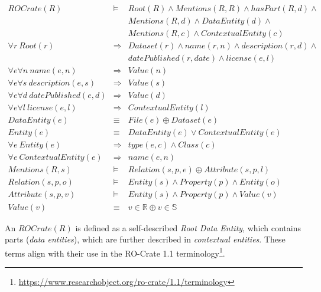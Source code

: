 \small
\begin{eqnarray*}
\label{minimalcrate}
ROCrate(R)                                  & \models & Root(R) \land Mentions(R, R) \land hasPart(R, d) \land \\
                                            & & Mentions(R, d) \land DataEntity(d) \land \\
                                            & & Mentions(R, c) \land ContextualEntity(c) \\
\forall r \ Root(r)                         & \Rightarrow & Dataset(r) \land name(r, n) \land description(r, d) \land \\
                                            & &             datePublished(r, date) \land license(e, l) \\
\forall e \forall n \ name(e, n)            & \Rightarrow & Value(n) \\
\forall e \forall s \ description(e, s)     & \Rightarrow & Value(s) \\
\forall e \forall d \ datePublished(e, d)   & \Rightarrow & Value(d) \\
\forall e \forall l \ license(e, l)         & \Rightarrow & ContextualEntity(l) \\
DataEntity(e)                               & \equiv &      File(e) \oplus Dataset(e) \\
Entity(e)                                   & \equiv &      DataEntity(e) \lor ContextualEntity(e) \\
\forall e \ Entity(e)                       & \Rightarrow & type(e, c) \land Class(c) \\
\forall e \ ContextualEntity(e)             & \Rightarrow & name(e, n)  \\
Mentions(R, s)                              & \models &     Relation(s, p, e) \oplus Attribute(s,  p, l) \\
Relation(s, p, o)                           & \models &     Entity(s) \land Property(p) \land  Entity(o) \\
Attribute(s, p, v)                          & \models &     Entity(s) \land Property(p) \land Value(v) \\
Value(v)                                    & \equiv &      v \in \mathbb{R} \oplus v \in \mathbb{S}
\end{eqnarray*}
\normalsize

An $ROCrate(R)$ is defined as a self-described \emph{Root Data Entity}, which contains parts (\emph{data entities}), which are further described in \emph{contextual entities}.  These terms align with their use in the RO-Crate 1.1 terminology\footnote{
    \url{https://www.researchobject.org/ro-crate/1.1/terminology}}.

